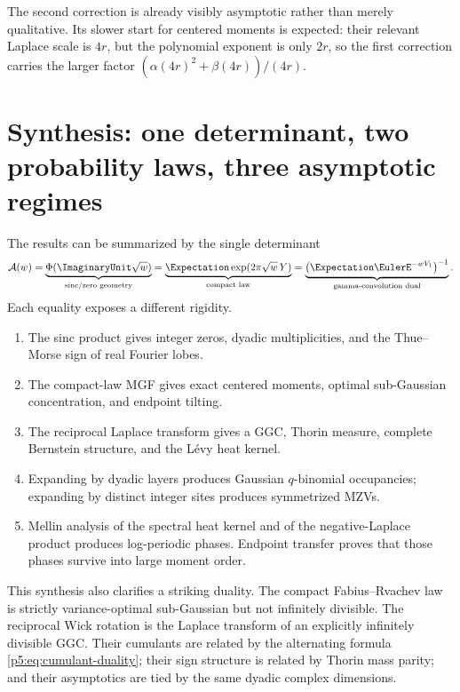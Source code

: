 \documentclass[11pt]{article}
\numberwithin{equation}{section}
\theoremstyle{definition}
\theoremstyle{remark}
\begin{document}
The second correction is already visibly asymptotic rather than merely
qualitative.  Its slower start for centered moments is expected: their
relevant Laplace scale is $4r$, but the polynomial exponent is only $2r$, so
the first correction carries the larger factor
$(\alpha(4r)^2+\beta(4r))/(4r)$.

\section{Synthesis: one determinant, two probability laws, three asymptotic regimes}

The results can be summarized by the single determinant
\begin{equation}\label{p5:eq:synthesis-A}
 \mathcal A(w)=
 \underbrace{\Phi(\ImaginaryUnit\sqrt w)}_{\text{sinc/zero geometry}}
 =\underbrace{\Expectation\exp(2\pi\sqrt w\,Y)}_{\text{compact law}}
 =\underbrace{\bigl(\Expectation\EulerE^{-wV_1}\bigr)^{-1}}_{\text{gamma-convolution dual}}.
\end{equation}
Each equality exposes a different rigidity.

\begin{enumerate}
\item The sinc product gives integer zeros, dyadic multiplicities, and the
      Thue--Morse sign of real Fourier lobes.
\item The compact-law MGF gives exact centered moments, optimal sub-Gaussian
      concentration, and endpoint tilting.
\item The reciprocal Laplace transform gives a GGC, Thorin measure, complete
      Bernstein structure, and the L\'evy heat kernel.
\item Expanding by dyadic layers produces Gaussian $q$-binomial occupancies;
      expanding by distinct integer sites produces symmetrized MZVs.
\item Mellin analysis of the spectral heat kernel and of the negative-Laplace
      product produces log-periodic phases.  Endpoint transfer proves that
      those phases survive into large moment order.
\end{enumerate}

This synthesis also clarifies a striking duality.  The compact Fabius--Rvachev
law is strictly variance-optimal sub-Gaussian but not infinitely divisible.
The reciprocal Wick rotation is the Laplace transform of an explicitly
infinitely divisible GGC.  Their cumulants are related by the alternating
formula \cref{p5:eq:cumulant-duality}; their sign structure is related by Thorin
mass parity; and their asymptotics are tied by the same dyadic complex
dimensions.
\end{document}

